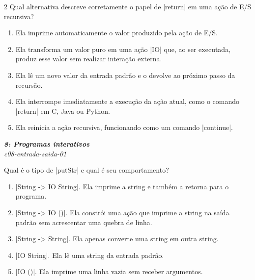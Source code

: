 \documentclass[a4paper,10pt,brazil]{article}
\begin{document}
\begin{multicols}{2}
Qual alternativa descreve corretamente o papel de \haskellinline|return| em uma ação de E/S recursiva?

\begin{enumerate}
  \item Ela imprime automaticamente o valor produzido pela ação de E/S.

  \item Ela transforma um valor puro em uma ação \haskellinline|IO| que, ao ser executada, produz esse valor sem realizar interação externa.

  \item Ela lê um novo valor da entrada padrão e o devolve ao próximo passo da recursão.

  \item Ela interrompe imediatamente a execução da ação atual, como o comando \haskellinline|return| em C, Java ou Python.

  \item Ela reinicia a ação recursiva, funcionando como um comando \haskellinline|continue|.


\end{enumerate}

\begin{flushright}
  \footnotesize
  \textit{\textbf{8: Programas interativos}}\\
  \textit{c08-entrada-saida-01}\\

\end{flushright}
Qual é o tipo de \haskellinline|putStr| e qual é seu comportamento?

\begin{enumerate}
  \item \haskellinline|String -> IO String|. Ela imprime a string e também a retorna para o programa.

  \item \haskellinline|String -> IO ()|. Ela constrói uma ação que imprime a string na saída padrão sem acrescentar uma quebra de linha.

  \item \haskellinline|String -> String|. Ela apenas converte uma string em outra string.

  \item \haskellinline|IO String|. Ela lê uma string da entrada padrão.

  \item \haskellinline|IO ()|. Ela imprime uma linha vazia sem receber argumentos.



\end{enumerate}
\end{multicols}
\end{document}
